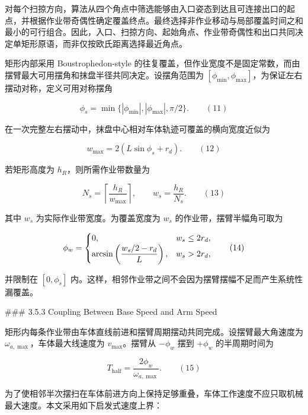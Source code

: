 对每个扫掠方向，算法从四个角点中筛选能够由入口姿态到达且可连接出口的起点，并根据作业带奇偶性确定覆盖终点。最终选择非作业移动与局部覆盖时间之和最小的可行组合。因此，入口、扫掠方向、起始角点、作业带奇偶性和出口共同决定单矩形原语，而非仅按欧氏距离选择最近角点。

  

矩形内部采用 Boustrophedon-style 的往复覆盖，但作业宽度不是固定常数，而由摆臂最大可用摆角和抹盘半径共同决定。设摆角范围为 $[\phi_{\min},\phi_{\max}]$，为保证左右摆动对称，定义可用对称摆角

  

$$
\phi_s=\min\{|\phi_{\min}|,|\phi_{\max}|,\pi/2\}.
\qquad(11)
$$

  

在一次完整左右摆动中，抹盘中心相对车体轨迹可覆盖的横向宽度近似为

  

$$
w_{\max}=2(L\sin\phi_s+r_d).
\qquad(12)
$$

  

若矩形高度为 $h_R$，则所需作业带数量为

  

$$
N_s=\left\lceil\frac{h_R}{w_{\max}}\right\rceil,
\qquad
w_s=\frac{h_R}{N_s}.
\qquad(13)
$$

  

其中 $w_s$ 为实际作业带宽度。为覆盖宽度为 $w_s$ 的作业带，摆臂半幅角可取为

  

$$
\phi_w=
\begin{cases}
0, & w_s\le 2r_d,\cr
\arcsin\left(\dfrac{w_s/2-r_d}{L}\right), & w_s>2r_d,
\end{cases}
\qquad(14)
$$

  

并限制在 $[0,\phi_s]$ 内。这样，相邻作业带之间不会因为摆臂摆幅不足而产生系统性漏覆盖。

  

### 3.5.3 Coupling Between Base Speed and Arm Speed

  

矩形内每条作业带由车体直线前进和摆臂周期摆动共同完成。设摆臂最大角速度为 $\omega_{a,\max}$，车体最大线速度为 $v_{\max}$。摆臂从 $-\phi_w$ 摆到 $+\phi_w$ 的半周期时间为

  

$$
T_{\mathrm{half}}
=\frac{2\phi_w}{\omega_{a,\max}}.
\qquad(15)
$$

  

为了使相邻半次摆扫在车体前进方向上保持足够重叠，车体工作速度不应只取机械最大速度。本文采用如下启发式速度上界：

